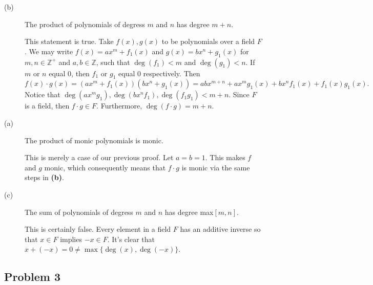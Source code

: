 \documentclass[../hw_sols.tex]{subfiles}
\begin{document}
\begin{description}

\item[(b)] The product of polynomials of degress $m$ and $n$ has degree $m+n$.

\begin{solution}
This statement is true. Take $f(x), g(x)$ to be polynomials over a field $F$. 
We may write $f(x) = ax^{m} + f_1(x)$ and $g(x) = bx^{n} + g_1(x)$ for 
$m,n \in \mathbb{Z}^+$ and $a,b \in \mathbb{Z}$, such that $\deg(f_1) < m$ and 
$\deg(g_1) < n$. If $m$ or $n$ equal 0, then $f_1$ or $g_1$ equal 0 
respectively. Then 
	$$f(x) \cdot g(x) = (ax^m + f_1(x))(bx^n + g_1(x)) 
	= abx^{m+n} + ax^mg_1(x) + bx^nf_1(x) + f_1(x)g_1(x).$$ 
Notice that $\deg(ax^mg_1), \deg(bx^nf_1), \deg(f_1g_1) < m + n$. Since $F$ 
is a field, then $f \cdot g \in F$. Furthermore, $\deg(f \cdot g) = m + n$.
\end{solution}

\item[(a)] The product of monic polynomials is monic.

\begin{solution}
This is merely a case of our previous proof. Let $a = b = 1$. This makes $f$ 
and $g$ monic, which consequently means that $f \cdot g$ is monic via the 
same steps in \textbf{(b)}.
\end{solution}

\item[(c)] The sum of polynomials of degress $m$ and $n$ has degree max$[m,n]$.

\begin{solution}
This is certainly false. Every element in a field $F$ has an additive inverse 
so that $x \in F$ implies $-x \in F$. It's clear that 
$x + (-x) = 0 \neq \max\{\deg(x),\deg(-x)\}$.
\end{solution}

\end{description}


\newpage



\subsection*{Problem 3}
\end{document}
